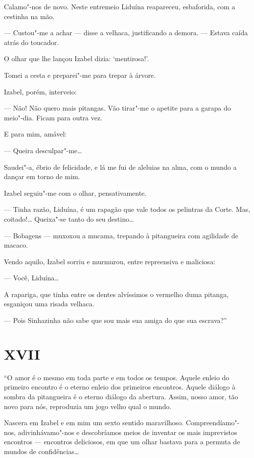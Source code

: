 Calamo"-nos de novo. Neste entremeio Liduína reapareceu, esbaforida, com
a cestinha na mão.

--- Custou"-me a achar --- disse a velhaca, justificando a demora. ---
Estava caída atrás do toucador.

O olhar que lhe lançou Izabel dizia: `mentirosa!'.

Tomei a cesta e preparei"-me para trepar à árvore.

Izabel, porém, interveio:

--- Não! Não quero mais pitangas. Vão tirar"-me o apetite para a garapa
do meio"-dia. Ficam para outra vez.

E para mim, amável:

--- Queira desculpar"-me\ldots{}

Saudei"-a, ébrio de felicidade, e lá me fui de aleluias na alma, com o
mundo a dançar em torno de mim.

Izabel seguiu"-me com o olhar, pensativamente.

--- Tinha razão, Liduína, é um rapagão que vale todos os pelintras da
Corte. Mas, coitado!\ldots{} Queixa"-se tanto do seu destino\ldots{}

--- Bobagens --- muxoxou a mucama, trepando à pitangueira com agilidade
de macaco.

Vendo aquilo, Izabel sorriu e murmurou, entre repreensiva e maliciosa:

--- Você, Liduína\ldots{}

A rapariga, que tinha entre os dentes alvíssimos o vermelho duma
pitanga, esganiçou uma risada velhaca.

--- Pois Sinhazinha não sabe que sou mais sua amiga do que sua
escrava?''

\section*{XVII}

``O amor é o mesmo em toda parte e em todos os tempos. Aquele enleio do
primeiro encontro é o eterno enleio dos primeiros encontros. Aquele
diálogo à sombra da pitangueira é o eterno diálogo da abertura. Assim,
nosso amor, tão novo para nós, reproduzia um jogo velho qual o mundo.

Nascera em Izabel e em mim um sexto sentido maravilhoso.
Compreendíamo"-nos, adivinhávamo"-nos e descobríamos meios de inventar os
mais imprevistos encontros --- encontros deliciosos, em que um olhar
bastava para a permuta de mundos de confidências\ldots{}

